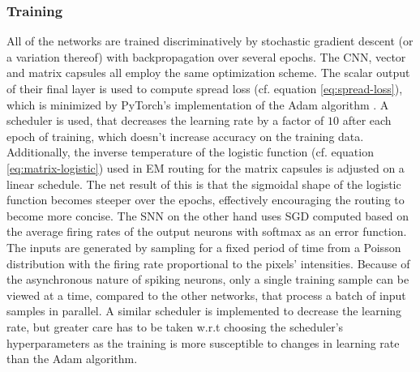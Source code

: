 \subsubsection{Training}
All of the networks are trained discriminatively by stochastic gradient descent (or a variation thereof) with backpropagation over several epochs. The CNN, vector and matrix capsules all employ the same optimization scheme. The scalar output of their final layer is used to compute spread loss (cf. equation \ref{eq:spread-loss}), which is minimized by PyTorch's implementation of the Adam algorithm \cite{kingma2014adam}. A scheduler is used, that decreases the learning rate by a factor of $\num{10}$ after each epoch of training, which doesn't increase accuracy on the training data. Additionally, the inverse temperature of the logistic function (cf. equation \ref{eq:matrix-logistic}) used in EM routing for the matrix capsules is adjusted on a linear schedule. The net result of this is that the sigmoidal shape of the logistic function becomes steeper over the epochs, effectively encouraging the routing to become more concise. The SNN on the other hand uses SGD computed based on the average firing rates of the output neurons with softmax as an error function. The inputs are generated by sampling for a fixed period of time from a Poisson distribution with the firing rate proportional to the pixels' intensities. Because of the asynchronous nature of spiking neurons, only a single training sample can be viewed at a time, compared to the other networks, that process a batch of input samples in parallel. A similar scheduler is implemented to decrease the learning rate, but greater care has to be taken w.r.t choosing the scheduler's hyperparameters as the training is more susceptible to changes in learning rate than the Adam algorithm.
